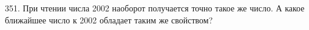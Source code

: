 351. При чтении числа 2002 наоборот получается точно такое же число. А какое ближайшее число к 2002 обладает таким же свойством?\\
